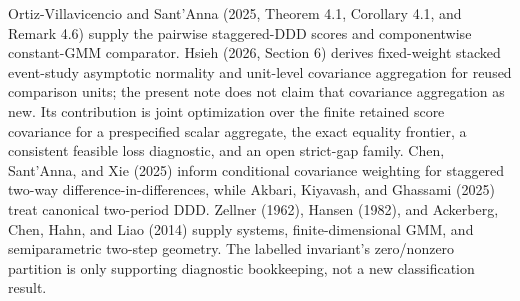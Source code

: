 Ortiz-Villavicencio and Sant'Anna (2025, Theorem 4.1, Corollary 4.1, and Remark 4.6) supply the pairwise staggered-DDD scores and componentwise constant-GMM comparator. Hsieh (2026, Section 6) derives fixed-weight stacked event-study asymptotic normality and unit-level covariance aggregation for reused comparison units; the present note does not claim that covariance aggregation as new. Its contribution is joint optimization over the finite retained score covariance for a prespecified scalar aggregate, the exact equality frontier, a consistent feasible loss diagnostic, and an open strict-gap family. Chen, Sant'Anna, and Xie (2025) inform conditional covariance weighting for staggered two-way difference-in-differences, while Akbari, Kiyavash, and Ghassami (2025) treat canonical two-period DDD. Zellner (1962), Hansen (1982), and Ackerberg, Chen, Hahn, and Liao (2014) supply systems, finite-dimensional GMM, and semiparametric two-step geometry. The labelled invariant's zero/nonzero partition is only supporting diagnostic bookkeeping, not a new classification result.